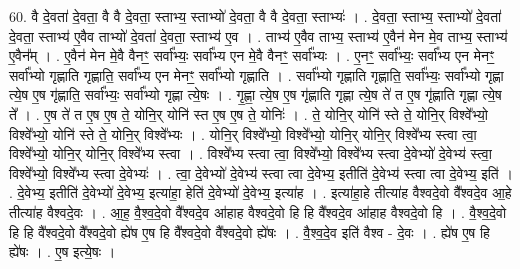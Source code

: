 \documentclass[17pt]{extarticle}
\begin{document}
60. वै दे॒वता॑ दे॒वता॒ वै वै दे॒वता॒ स्ताभ्य॒ स्ताभ्यो॑ दे॒वता॒ वै वै दे॒वता॒ स्ताभ्यः॑ । . दे॒वता॒ स्ताभ्य॒ स्ताभ्यो॑ दे॒वता॑ दे॒वता॒ स्ताभ्य॑ ए॒वैव ताभ्यो॑ दे॒वता॑ दे॒वता॒ स्ताभ्य॑ ए॒व । . ताभ्य॑ ए॒वैव ताभ्य॒ स्ताभ्य॑ ए॒वैन॑ मेन मे॒व ताभ्य॒ स्ताभ्य॑ ए॒वैन᳚म् । . ए॒वैन॑ मेन मे॒वै वैनꣳ॒॒ सर्वा᳚भ्यः॒ सर्वा᳚भ्य एन मे॒वै वैनꣳ॒॒ सर्वा᳚भ्यः । . ए॒नꣳ॒॒ सर्वा᳚भ्यः॒ सर्वा᳚भ्य एन मेनꣳ॒॒ सर्वा᳚भ्यो गृह्णाति गृह्णाति॒ सर्वा᳚भ्य एन मेनꣳ॒॒ सर्वा᳚भ्यो गृह्णाति । . सर्वा᳚भ्यो गृह्णाति गृह्णाति॒ सर्वा᳚भ्यः॒ सर्वा᳚भ्यो गृह्णा त्ये॒ष ए॒ष गृ॑ह्णाति॒ सर्वा᳚भ्यः॒ सर्वा᳚भ्यो गृह्णा त्ये॒षः । . गृ॒ह्णा॒ त्ये॒ष ए॒ष गृ॑ह्णाति गृह्णा त्ये॒ष ते॑ त ए॒ष गृ॑ह्णाति गृह्णा त्ये॒ष ते᳚ । . ए॒ष ते॑ त ए॒ष ए॒ष ते॒ योनि॒र् योनि॑ स्त ए॒ष ए॒ष ते॒ योनिः॑ । . ते॒ योनि॒र् योनि॑ स्ते ते॒ योनि॒र् विश्वे᳚भ्यो॒ विश्वे᳚भ्यो॒ योनि॑ स्ते ते॒ योनि॒र् विश्वे᳚भ्यः । . योनि॒र् विश्वे᳚भ्यो॒ विश्वे᳚भ्यो॒ योनि॒र् योनि॒र् विश्वे᳚भ्य स्त्वा त्वा॒ विश्वे᳚भ्यो॒ योनि॒र् योनि॒र् विश्वे᳚भ्य स्त्वा । . विश्वे᳚भ्य स्त्वा त्वा॒ विश्वे᳚भ्यो॒ विश्वे᳚भ्य स्त्वा दे॒वेभ्यो॑ दे॒वेभ्य॑ स्त्वा॒ विश्वे᳚भ्यो॒ विश्वे᳚भ्य स्त्वा दे॒वेभ्यः॑ । . त्वा॒ दे॒वेभ्यो॑ दे॒वेभ्य॑ स्त्वा त्वा दे॒वेभ्य॒ इतीति॑ दे॒वेभ्य॑ स्त्वा त्वा दे॒वेभ्य॒ इति॑ । . दे॒वेभ्य॒ इतीति॑ दे॒वेभ्यो॑ दे॒वेभ्य॒ इत्या॑हा॒ हेति॑ दे॒वेभ्यो॑ दे॒वेभ्य॒ इत्या॑ह । . इत्या॑हा॒हे तीत्या॑ह वैश्वदे॒वो वै᳚श्वदे॒व आ॒हे तीत्या॑ह वैश्वदे॒वः । . आ॒ह॒ वै॒श्व॒दे॒वो वै᳚श्वदे॒व आ॑हाह वैश्वदे॒वो हि हि वै᳚श्वदे॒व आ॑हाह वैश्वदे॒वो हि । . वै॒श्व॒दे॒वो हि हि वै᳚श्वदे॒वो वै᳚श्वदे॒वो ह्ये॑ष ए॒ष हि वै᳚श्वदे॒वो वै᳚श्वदे॒वो ह्ये॑षः । . वै॒श्व॒दे॒व इति॑ वैश्व - दे॒वः । . ह्ये॑ष ए॒ष हि ह्ये॑षः । . ए॒ष इत्ये॒षः । \newline
\pagebreak
{}
\end{document}
